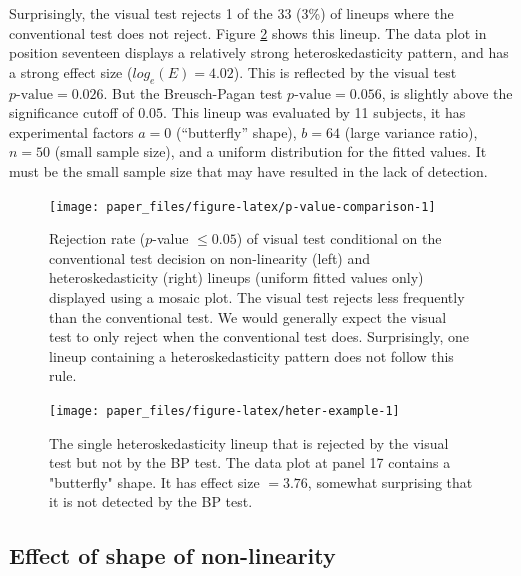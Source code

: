 \documentclass[]{interact}
\theoremstyle{plain}%
\theoremstyle{definition}
\theoremstyle{remark}
\begin{document}
Surprisingly, the visual test rejects 1 of the 33 (3\%) of lineups where
the conventional test does not reject. Figure \ref{fig:heter-example}
shows this lineup. The data plot in position seventeen displays a
relatively strong heteroskedasticity pattern, and has a strong effect
size (\(log_e(E)=4.02\)). This is reflected by the visual test
\(p\text{-value} = 0.026\). But the Breusch-Pagan test
\(p\text{-value} = 0.056\), is slightly above the significance cutoff of
\(0.05\). This lineup was evaluated by 11 subjects, it has experimental
factors \(a = 0\) (``butterfly'' shape), \(b = 64\) (large variance
ratio), \(n = 50\) (small sample size), and a uniform distribution for
the fitted values. It must be the small sample size that may have
resulted in the lack of detection.

\begin{figure}

{\centering \texttt{[image: paper\_files/figure-latex/p-value-comparison-1]} 

}

\caption{Rejection rate ($p$-value $\leq0.05$) of visual test conditional on the conventional test decision on non-linearity (left) and heteroskedasticity (right) lineups (uniform fitted values only) displayed using a mosaic plot. The visual test rejects less frequently than the conventional test. We would generally expect the visual test to only reject when the conventional test does. Surprisingly, one lineup containing a heteroskedasticity pattern does not follow this rule. }\label{fig:p-value-comparison}
\end{figure}

\begin{figure}

{\centering \texttt{[image: paper\_files/figure-latex/heter-example-1]} 

}

\caption{The single heteroskedasticity lineup that is rejected by the visual test but not by the BP test. The data plot at panel 17 contains a "butterfly" shape. It has effect size $ = 3.76$, somewhat surprising that it is not detected by the BP test.}\label{fig:heter-example}
\end{figure}

\hypertarget{effect-of-shape-of-non-linearity}{%
\subsection{Effect of shape of
non-linearity}\label{effect-of-shape-of-non-linearity}}
\end{document}
